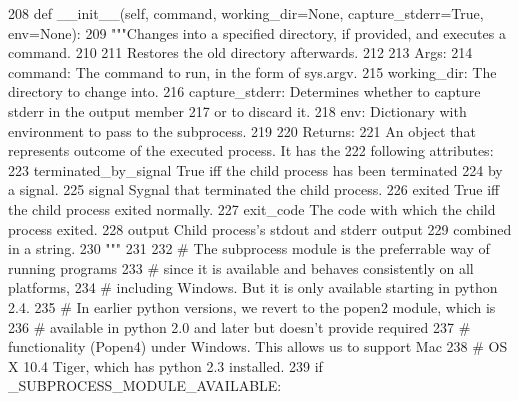 \begin{DoxyCode}
208   \textcolor{keyword}{def }\_\_init\_\_(self, command, working\_dir=None, capture\_stderr=True, env=None):
209     \textcolor{stringliteral}{"""Changes into a specified directory, if provided, and executes a command.}
210 \textcolor{stringliteral}{}
211 \textcolor{stringliteral}{    Restores the old directory afterwards.}
212 \textcolor{stringliteral}{}
213 \textcolor{stringliteral}{    Args:}
214 \textcolor{stringliteral}{      command:        The command to run, in the form of sys.argv.}
215 \textcolor{stringliteral}{      working\_dir:    The directory to change into.}
216 \textcolor{stringliteral}{      capture\_stderr: Determines whether to capture stderr in the output member}
217 \textcolor{stringliteral}{                      or to discard it.}
218 \textcolor{stringliteral}{      env:            Dictionary with environment to pass to the subprocess.}
219 \textcolor{stringliteral}{}
220 \textcolor{stringliteral}{    Returns:}
221 \textcolor{stringliteral}{      An object that represents outcome of the executed process. It has the}
222 \textcolor{stringliteral}{      following attributes:}
223 \textcolor{stringliteral}{        terminated\_by\_signal   True iff the child process has been terminated}
224 \textcolor{stringliteral}{                               by a signal.}
225 \textcolor{stringliteral}{        signal                 Sygnal that terminated the child process.}
226 \textcolor{stringliteral}{        exited                 True iff the child process exited normally.}
227 \textcolor{stringliteral}{        exit\_code              The code with which the child process exited.}
228 \textcolor{stringliteral}{        output                 Child process's stdout and stderr output}
229 \textcolor{stringliteral}{                               combined in a string.}
230 \textcolor{stringliteral}{    """}
231 
232     \textcolor{comment}{# The subprocess module is the preferrable way of running programs}
233     \textcolor{comment}{# since it is available and behaves consistently on all platforms,}
234     \textcolor{comment}{# including Windows. But it is only available starting in python 2.4.}
235     \textcolor{comment}{# In earlier python versions, we revert to the popen2 module, which is}
236     \textcolor{comment}{# available in python 2.0 and later but doesn't provide required}
237     \textcolor{comment}{# functionality (Popen4) under Windows. This allows us to support Mac}
238     \textcolor{comment}{# OS X 10.4 Tiger, which has python 2.3 installed.}
239     \textcolor{keywordflow}{if} \_SUBPROCESS\_MODULE\_AVAILABLE:

\end{DoxyCode}
